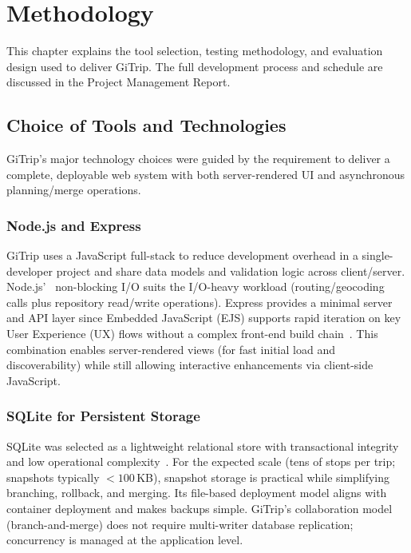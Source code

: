 \chapter{Methodology}
\label{ch:methodology}

This chapter explains the tool selection, testing methodology, and evaluation
design used to deliver GiTrip. The full development process and schedule are discussed in the Project Management Report.

\section{Choice of Tools and Technologies}
GiTrip's major technology choices were guided by the requirement to deliver a
complete, deployable web system with both server-rendered UI and asynchronous
planning/merge operations.

\subsection{Node.js and Express}
GiTrip uses a JavaScript full-stack to reduce development overhead in a
single-developer project and share data models and validation logic across
client/server. Node.js'~\cite{ref_node_about} non-blocking I/O suits the I/O-heavy workload (routing/geocoding calls plus repository
read/write operations). Express provides a minimal server and API layer since Embedded JavaScript (EJS) supports rapid iteration on key User Experience (UX)
flows without a complex front-end build chain~\cite{ref_express}. This combination
enables server-rendered views (for fast initial load and discoverability) while
still allowing interactive enhancements via client-side JavaScript.

\subsection{SQLite for Persistent Storage}
SQLite was selected as a lightweight relational store with transactional integrity and low operational complexity~\cite{ref_sqlite_about}. For
the expected scale (tens of stops per trip; snapshots typically $<100$\,KB),
snapshot storage is practical while simplifying branching, rollback, and
merging. Its file-based
deployment model aligns with container deployment and makes backups simple. GiTrip's collaboration model (branch-and-merge) does not require
multi-writer database replication; concurrency is managed at the application
level.

